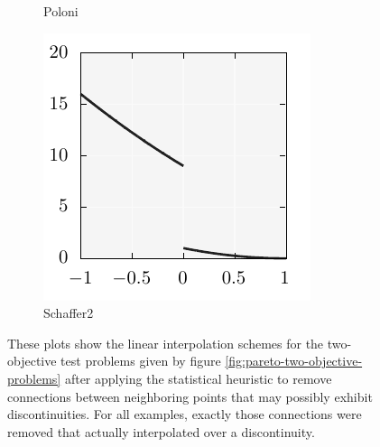 \documentclass{stdlocal}
\begin{document}
\begin{figure}[t]
\begin{subfigure}[b]{0.24\textwidth}
        \caption{Poloni}
      \end{subfigure}
      \begin{subfigure}[b]{0.24\textwidth}
        \center
        \includegraphics[width=\textwidth]{../../plots/schaffer2_tessellation.pdf}
        \caption{Schaffer2}
      \end{subfigure}
      \caption[]{%
        These plots show the linear interpolation schemes for the two-objective test problems given by figure \ref{fig:pareto-two-objective-problems} after applying the statistical heuristic to remove connections between neighboring points that may possibly exhibit discontinuities.
        For all examples, exactly those connections were removed that actually interpolated over a discontinuity.
      }
      \label{fig:pareto-two-objective-problems-tessellation}
    \end{figure}
\end{document}
